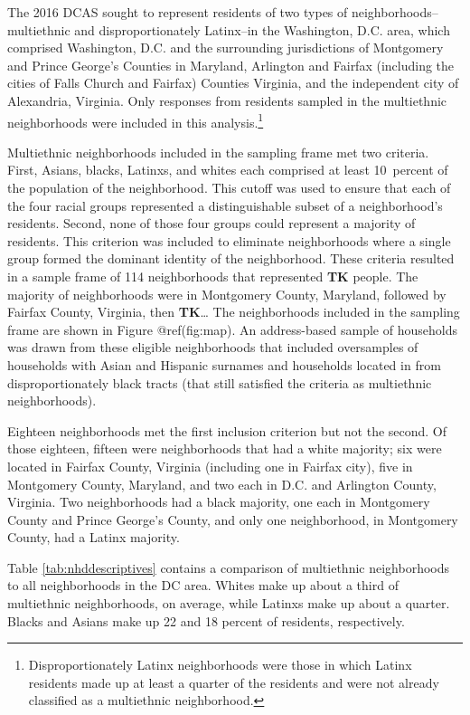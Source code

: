 \documentclass{baderart}
\begin{document}

The 2016 DCAS sought to represent residents of two types of neighborhoods--multiethnic and disproportionately Latinx--in the Washington, D.C. area, which comprised Washington, D.C. and the surrounding jurisdictions of Montgomery and Prince George's Counties in Maryland, Arlington and Fairfax (including the cities of Falls Church and Fairfax) Counties Virginia, and the independent city of Alexandria, Virginia. Only responses from residents sampled in the multiethnic neighborhoods were included in this analysis.\footnote{Disproportionately   Latinx neighborhoods were those in which Latinx residents made up at   least a quarter of the residents and were not already classified as a   multiethnic neighborhood.}

Multiethnic neighborhoods included in the sampling frame met two criteria. First, Asians, blacks, Latinxs, and whites each comprised at least 10~percent of the population of the neighborhood. This cutoff was used to ensure that each of the four racial groups represented a distinguishable subset of a neighborhood's residents. Second, none of those four groups could represent a majority of residents. This criterion was included to eliminate neighborhoods where a single group formed the dominant identity of the neighborhood. These criteria resulted in a sample frame of 114 neighborhoods that represented \textbf{TK} people. The majority of neighborhoods were in Montgomery County, Maryland, followed by Fairfax County, Virginia, then \textbf{TK}\ldots{} The neighborhoods included in the sampling frame are shown in Figure @ref(fig:map). An address-based sample of households was drawn from these eligible neighborhoods that included oversamples of households with Asian and Hispanic surnames and households located in from disproportionately black tracts (that still satisfied the criteria as multiethnic neighborhoods).

Eighteen neighborhoods met the first inclusion criterion but not the second. Of those eighteen, fifteen were neighborhoods that had a white majority; six were located in Fairfax County, Virginia (including one in Fairfax city), five in Montgomery County, Maryland, and two each in D.C. and Arlington County, Virginia. Two neighborhoods had a black majority, one each in Montgomery County and Prince George's County, and only one neighborhood, in Montgomery County, had a Latinx majority.

Table \ref{tab:nhddescriptives} contains a comparison of multiethnic neighborhoods to all neighborhoods in the DC area. Whites make up about a third of multiethnic neighborhoods, on average, while Latinxs make up about a quarter. Blacks and Asians make up 22 and 18 percent of residents, respectively.
\end{document}
